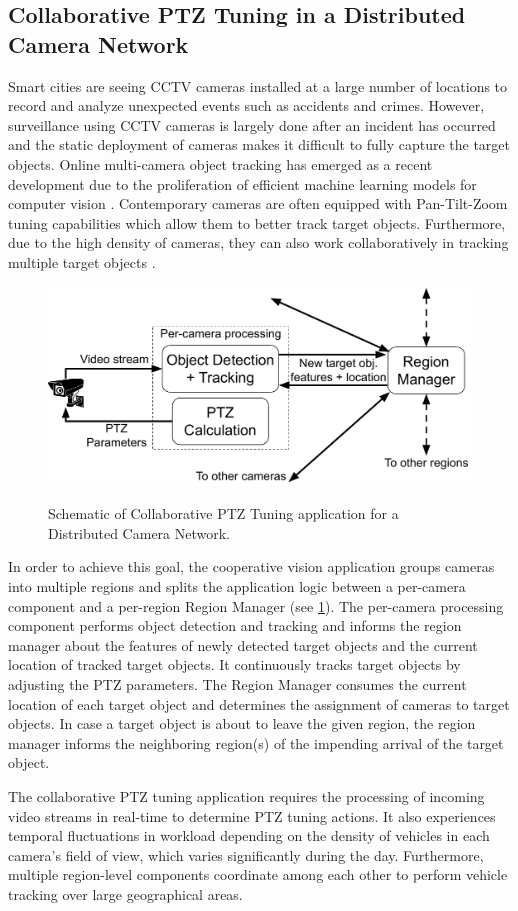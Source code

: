 \subsection{Collaborative PTZ Tuning in a Distributed Camera Network}
Smart cities are seeing CCTV cameras installed at a large number of locations to record and analyze unexpected events such as accidents and crimes. However, surveillance using CCTV cameras is largely done after an incident has occurred and the static deployment of cameras makes it difficult to fully capture the target objects. Online multi-camera object tracking has emerged as a recent development due to the proliferation of efficient machine learning models for computer vision \cite{coralpie}. Contemporary cameras are often equipped with Pan-Tilt-Zoom tuning capabilities which allow them to better track target objects. Furthermore, due to the high density of cameras, they can also work collaboratively in tracking multiple target objects \cite{matsuyama2002real}.
\begin{figure}[h]
\centering
\includegraphics[width=0.75\columnwidth]{figures/apps/multi_cam_ptz}
\label{fig:multi_cam_ptz_app}
\caption{Schematic of Collaborative PTZ Tuning application for a Distributed Camera Network.}
\end{figure}
\par In order to achieve this goal, the cooperative vision application groups cameras into multiple regions and splits the application logic between a per-camera component and a per-region Region Manager (see \cref{fig:multi_cam_ptz_app}). The per-camera processing component performs object detection and tracking and informs the region manager about the features of newly detected target objects and the current location of tracked target objects. It continuously tracks target objects by adjusting the PTZ parameters. The Region Manager consumes the current location of each target object and determines the assignment of cameras to target objects. In case a target object is about to leave the given region, the region manager informs the neighboring region(s) of the impending arrival of the target object.
\par The collaborative PTZ tuning application requires the processing of incoming video streams in real-time to determine PTZ tuning actions. It also experiences temporal fluctuations in workload depending on the density of vehicles in each camera's field of view, which varies significantly during the day. Furthermore, multiple region-level components coordinate among each other to perform vehicle tracking over large geographical areas.

